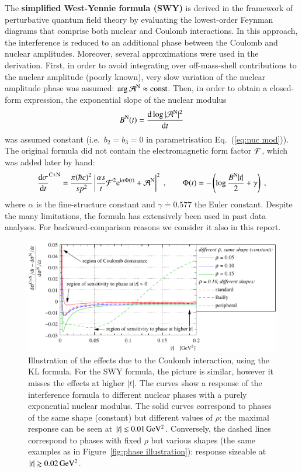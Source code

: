 The {\bf simplified West-Yennie formula (SWY)} \cite{wy68} is derived in the framework of perturbative quantum field theory by evaluating the lowest-order Feynman diagrams that comprise both nuclear and Coulomb interactions. In this approach, the interference is reduced to an additional phase between the Coulomb and nuclear amplitudes. Moreover, several approximations were used in the derivation. First, in order to avoid integrating over off-mass-shell contributions to the nuclear amplitude (poorly known), very slow variation of the nuclear amplitude phase was assumed: $\arg {\cal A}^{\rm N} \approx \hbox{const}$. Then, in order to obtain a closed-form expression, the exponential slope of the nuclear modulus
\begin{equation}
\label{eq:nuc slope}
B^{\rm N}(t) = {\d \log |{\cal A}^{\rm N}|^2 \over \d t}
\end{equation}
was assumed constant (i.e.~$b_2 = b_3 = 0$ in parametrisation Eq.~(\ref{eq:nuc mod})). The original formula did not contain the electromagnetic form factor ${\cal F}$, which was added later by hand:
\begin{equation}
\label{eq:int swy}
	{\d\sigma\over \d t}^{\rm C+N} = {\pi (\hbar c)^2 \over s p^2} \left | {\alpha s\over t} {\cal F}^2 \e^{\I\alpha \Phi(t)} + {\cal A}^{\rm N} \right |^2\ ,\qquad
	\Phi(t) = - \left( \log {B^{\rm N} |t|\over 2} + \gamma \right)\ ,
\end{equation}
where $\alpha$ is the fine-structure constant and $\gamma \doteq 0.577$ the Euler constant. Despite the many limitations, the formula has extensively been used in past data analyses. For backward-comparison reasons we consider it also in this report.

\begin{figure}
\begin{center}
\includegraphics{fig/cni_effect_illustration.pdf}
\caption{%
Illustration of the effects due to the Coulomb interaction, using the KL formula. For the SWY formula, the picture is similar, however it misses the effects at higher $|t|$. The curves show a response of the interference formula to different nuclear phases with a purely exponential nuclear modulus. The solid curves correspond to phases of the same shape (constant) but different values of $\rho$: the maximal response can be seen at $|t| \lesssim 0.01\,{\rm GeV^2}$. Conversely, the dashed lines correspond to phases with fixed $\rho$ but various shapes (the same examples as in Figure~\ref{fig:phase illustration}): response sizeable at $|t| \gtrsim 0.02\,{\rm GeV^2}$.
}
\label{fig:cni effect}
\end{center}
\end{figure}

